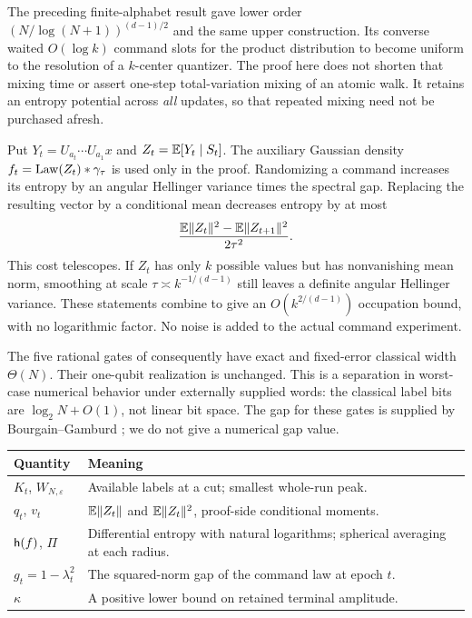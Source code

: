 The preceding finite-alphabet result \cite{GTF36} gave lower order
$(N/\log(N+1))^{(d-1)/2}$ and the same upper construction. Its converse
waited $O(\log k)$ command slots for the product distribution to become
uniform to the resolution of a $k$-center quantizer. The proof here does
not shorten that mixing time or assert one-step total-variation mixing
of an atomic walk. It retains an entropy potential across \emph{all}
updates, so that repeated mixing need not be purchased afresh.

Put $Y_t=U_{a_t}\cdots U_{a_1}x$ and
$Z_t=\mathbb E[Y_t\mid S_t]$. The auxiliary Gaussian density
$f_t=\operatorname{Law}(Z_t)*\gamma_\tau$ is used only in the proof.
Randomizing a command increases its entropy by an angular Hellinger
variance times the spectral gap. Replacing the resulting vector by a
conditional mean decreases entropy by at most
\[
 \frac{\mathbb E\lVert Z_t\rVert^2-\mathbb E\lVert Z_{t+1}\rVert^2}{2\tau^2}.
\]
This cost telescopes. If $Z_t$ has only $k$ possible values but has
nonvanishing mean norm, smoothing at scale $\tau\asymp k^{-1/(d-1)}$
still leaves a definite angular Hellinger variance. These statements
combine to give an $O(k^{2/(d-1)})$ occupation bound, with no logarithmic
factor. No noise is added to the actual command experiment.

The five rational gates of \cite{GTF36} consequently have exact and
fixed-error classical width $\Theta(N)$. Their one-qubit realization is
unchanged. This is a separation in worst-case numerical behavior under
externally supplied words: the classical label bits are
$\log_2N+O(1)$, not linear bit space. The gap for these gates is supplied
by Bourgain--Gamburd \cite{BG12}; we do not give a numerical gap value.

\begin{center}
\small
\begin{tabular}{p{}p{}}
\toprule
Quantity & Meaning \\
\midrule
$K_t$, $W_{N,\varepsilon}$ & Available labels at a cut; smallest whole-run peak. \\
$q_t$, $v_t$ & $\mathbb E\lVert Z_t\rVert$ and $\mathbb E\lVert Z_t\rVert^2$, proof-side conditional moments. \\
$\mathsf h(f)$, $\Pi$ & Differential entropy with natural logarithms; spherical averaging at each radius. \\
$g_t=1-\lambda_t^2$ & The squared-norm gap of the command law at epoch $t$. \\
$\kappa$ & A positive lower bound on retained terminal amplitude. \\
\bottomrule
\end{tabular}
\end{center}

